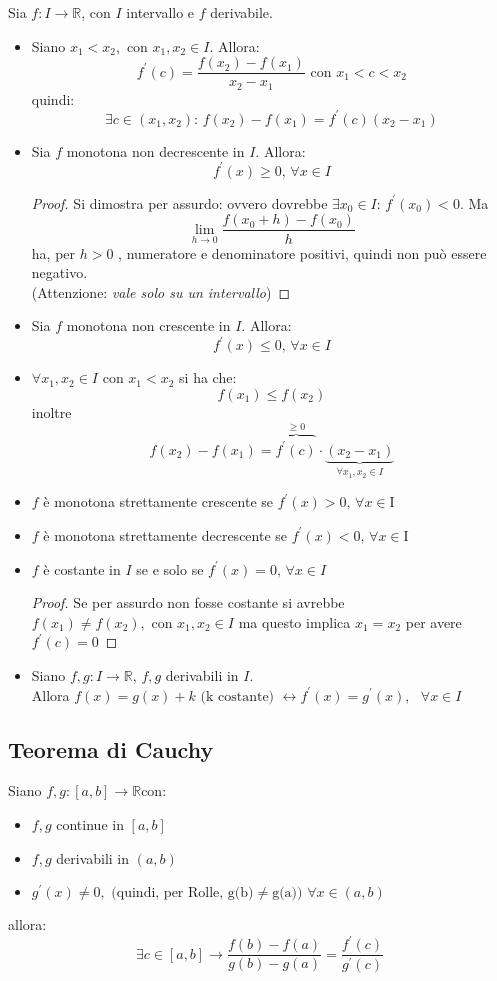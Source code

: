 \documentclass[a4paper,12pt, oneside]{book}
\begin{document}
\begin{corollario}
	Sia $f:I\rightarrow \mathbb{R}$, con $I$ intervallo e $f$ derivabile.
	\begin{itemize}
		\item Siano $x_1<x_2, \mbox{ con } x_1,x_2\in I$. Allora:
		      $$f^{'}(c)=\frac{f(x_2)-f(x_1)}{x_2-x_1}\mbox{ con } x_1<c<x_2$$
		      quindi:
		      $$\exists c\in(x_1,x_2)\mbox{: } f(x_2)-f(x_1)=f^{'}(c)(x_2-x_1)$$
		\item Sia $f$ monotona non decrescente in $I$. Allora: $$f^{'}(x)\geq 0\mbox{, }\forall x\in I$$
		      \begin{proof}
			      Si dimostra per assurdo: ovvero dovrebbe $\exists x_0\in I\mbox{: } f^{'}(x_0)<0$. Ma $$\lim_{h\rightarrow 0} \frac{f(x_0+h)-f(x_0)}{h}$$ ha, per $h>0$ , numeratore e denominatore positivi, quindi non può essere negativo.\\
			      (Attenzione: \textit{vale solo su un intervallo})
		      \end{proof}
		\item Sia $f$ monotona non crescente in $I$. Allora: $$f^{'}(x)\leq 0\mbox{, }\forall x\in I$$
		\item $\forall x_1, x_2 \in I\mbox{ con } x_1<x_2$ si ha che:
		      $$f(x_1)\leq f(x_2)$$
		      inoltre $$f(x_2)-f(x_1)=\overbrace{f^{'}(c)}^{\geq 0}\cdot\underbrace{(x_2-x_1)}_{\forall x_1, x_2 \in I}$$
		\item $f$ è monotona strettamente crescente se $f^{'}(x)>0 \mbox{, }\forall x\in $I
		\item $f$ è monotona strettamente decrescente se $f^{'}(x)<0 \mbox{, }\forall x\in $I
		\item $f$ è costante in $I$ se e solo se $f^{'}(x)=0\mbox{, }\forall x\in I$
		      \begin{proof}
			      Se per assurdo non fosse costante si avrebbe $f(x_1)\neq f(x_2), \mbox{ con } x_1,x_2\in I$ ma questo implica $x_1=x_2$ per avere $f^{'}(c)=0$
		      \end{proof}
		\item Siano $f,g:I\rightarrow \mathbb{R}$, $f,g$ derivabili in $I$. \\Allora $f(x)=g(x)+k\mbox { (k costante) }\longleftrightarrow f^{'}(x)=g^{'}(x),\mbox{ }\forall x\in I$
	\end{itemize}
\end{corollario}
\subsection{Teorema di Cauchy}
\begin{teorema}[di Cauchy]
	Siano $f,g:[a,b]\rightarrow \mathbb{R}$con:
	\begin{itemize}
		\item $f,g$ continue in $[a,b]$
		\item $f,g$ derivabili in $(a,b)$
		\item $g^{'}(x)\neq 0,\mbox{ (quindi, per Rolle, g(b)}\neq\mbox{g(a)) } \forall x\in (a,b)$
	\end{itemize}
	allora: $$\exists c\in [a,b]\rightarrow\frac{f(b)-f(a)}{g(b)-g(a)}=\frac{f^{'}(c)}{g^{'}(c)}$$
\end{teorema}
\end{document}

